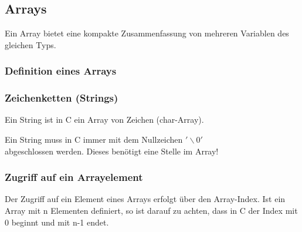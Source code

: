 	\subsection{Arrays }
		Ein Array bietet eine kompakte Zusammenfassung von mehreren Variablen des gleichen Typs.
		
		\begin{minipage}[t]{10.5 cm}
			\subsubsection{Definition eines Arrays }
				\vspace*{-0.3cm}
				
			\subsubsection{Zeichenketten (Strings) }
				\begin{compactitem}
					\item Ein String ist in C ein Array von Zeichen (char-Array).
					\item Ein String muss in C immer mit dem Nullzeichen $'\backslash0'$ \\
					abgeschlossen werden. Dieses benötigt eine Stelle im Array!					
				\end{compactitem}
				
		\end{minipage}	
		\begin{minipage}[t]{8.5 cm}
			\subsubsection{Zugriff auf ein Arrayelement }
				Der Zugriff auf ein Element eines Arrays erfolgt über den Array-Index. Ist ein Array mit n Elementen definiert, so ist darauf zu achten, dass in C der Index mit 0 beginnt und mit n-1 endet.
				
		\end{minipage}	

